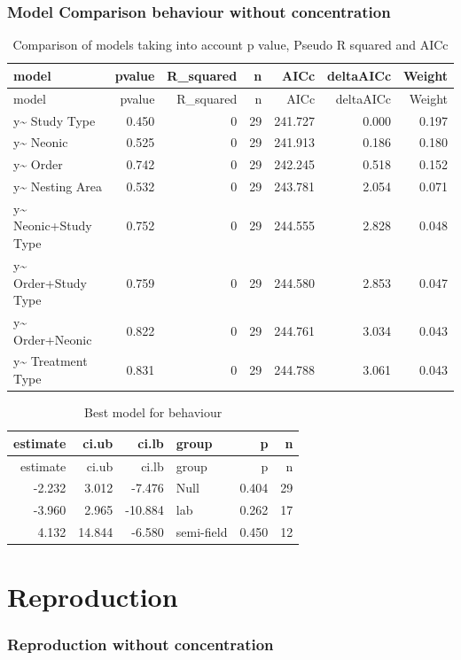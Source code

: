 \documentclass[]{elsarticle} %
\begin{document}
\subsubsection{Model Comparison behaviour without
concentration}\label{model-comparison-behaviour-without-concentration}

\begin{longtable}[c]{@{}lrrrrrr@{}}
\caption{Comparison of models taking into account p value, Pseudo R
squared and AICc}\tabularnewline
\toprule
model & pvalue & R\_squared & n & AICc & deltaAICc &
Weight\tabularnewline
\midrule
\endfirsthead
\toprule
model & pvalue & R\_squared & n & AICc & deltaAICc &
Weight\tabularnewline
\midrule
\endhead
y\textasciitilde{} Study Type & 0.450 & 0 & 29 & 241.727 & 0.000 &
0.197\tabularnewline
y\textasciitilde{} Neonic & 0.525 & 0 & 29 & 241.913 & 0.186 &
0.180\tabularnewline
y\textasciitilde{} Order & 0.742 & 0 & 29 & 242.245 & 0.518 &
0.152\tabularnewline
y\textasciitilde{} Nesting Area & 0.532 & 0 & 29 & 243.781 & 2.054 &
0.071\tabularnewline
y\textasciitilde{} Neonic+Study Type & 0.752 & 0 & 29 & 244.555 & 2.828
& 0.048\tabularnewline
y\textasciitilde{} Order+Study Type & 0.759 & 0 & 29 & 244.580 & 2.853 &
0.047\tabularnewline
y\textasciitilde{} Order+Neonic & 0.822 & 0 & 29 & 244.761 & 3.034 &
0.043\tabularnewline
y\textasciitilde{} Treatment Type & 0.831 & 0 & 29 & 244.788 & 3.061 &
0.043\tabularnewline
\bottomrule
\end{longtable}

\begin{longtable}[c]{@{}rrrlrr@{}}
\caption{Best model for behaviour}\tabularnewline
\toprule
estimate & ci.ub & ci.lb & group & p & n\tabularnewline
\midrule
\endfirsthead
\toprule
estimate & ci.ub & ci.lb & group & p & n\tabularnewline
\midrule
\endhead
-2.232 & 3.012 & -7.476 & Null & 0.404 & 29\tabularnewline
-3.960 & 2.965 & -10.884 & lab & 0.262 & 17\tabularnewline
4.132 & 14.844 & -6.580 & semi-field & 0.450 & 12\tabularnewline
\bottomrule
\end{longtable}

\section{Reproduction}\label{reproduction}

\subsubsection{Reproduction without
concentration}\label{reproduction-without-concentration}
\end{document}
